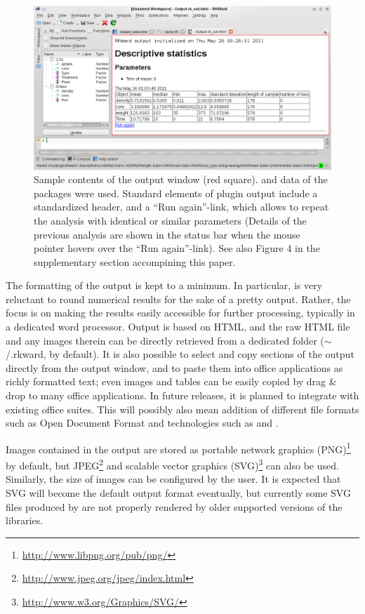 \begin{figure}[t!]
 \centering
 \includegraphics[width=15.5cm]{./figures/results_output_cropped.png}
 \caption{Sample contents of the output window (red square).  and  data of the  packages were used. 
  Standard elements of plugin output include a standardized header, and a 
  ``Run again''-link, which allows to repeat the analysis with identical or 
  similar parameters (Details of the previous analysis are shown in the status bar when the mouse pointer hovers over the ``Run again''-link). See also Figure 4 in the supplementary section accompining this paper.}
 \label{fig:results_output}
\end{figure}

The formatting of the output is kept to a minimum. In particular,
 is very reluctant to round numerical results for the sake of a
pretty output. Rather, the focus is on making the results easily
accessible for further processing, typically in a dedicated word
processor. Output is based on
HTML, and the raw
HTML file and any images therein can be directly
retrieved from a dedicated folder
($\sim\!$/.rkward, by default). It is also
possible to select and copy sections of the output directly from the
output window, and to paste them into office applications as
richly formatted text; even images and tables can be easily copied by drag \& drop to many office applications. In future releases, 
it is planned to integrate 
with existing office suites. This
will possibly also mean addition of different file formats such as Open Document Format and technologies such as  and 
\citep{Leisch2002, Kuhn2006}.

Images contained in the output are stored as
portable network graphics (PNG)\footnote{\url{http://www.libpng.org/pub/png/}} by
default, but JPEG\footnote{\url{http://www.jpeg.org/jpeg/index.html}} and
scalable vector graphics (SVG)\footnote{\url{http://www.w3.org/Graphics/SVG/}}
can also be used. Similarly, the size of 
images can be configured by the user. It is expected that SVG will
become the default output format eventually, but currently some SVG
files produced by  are not properly
rendered by older supported versions of the
 libraries.
\newpage 
